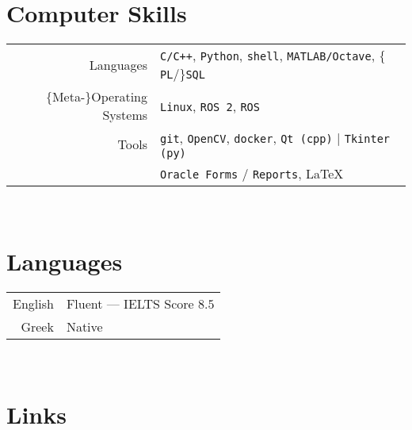 \documentclass[a4paper,10pt,twoside]{article}
\begin{document}
\section{Computer Skills}

\begin{tabular}{rp{12cm}}
Languages & \texttt{C/C++}, \texttt{Python}, \texttt{shell}, \texttt{MATLAB/Octave}, $\{$\texttt{PL}/$\}$\texttt{SQL}\\
$\{$Meta-$\}$Operating Systems & \texttt{Linux}, \texttt{ROS 2}, \texttt{ROS} \\
Tools & \texttt{git}, \texttt{OpenCV}, \texttt{docker}, \texttt{Qt (cpp)} | \texttt{Tkinter (py)}\\
      & \texttt{Oracle Forms} / \texttt{Reports}, \LaTeX\\
\end{tabular} \\



\section{Languages}

\begin{tabular}{rp{12cm}}
English & Fluent --- IELTS Score $8.5$ \\
Greek & Native \\
\end{tabular} \\


\section{Links}
\end{document}
